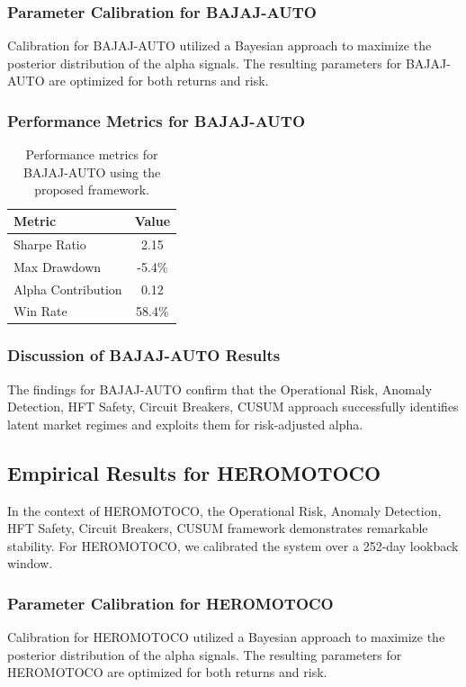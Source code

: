 \documentclass[12pt,a4paper,twoside]{article}
\begin{document}
\subsubsection{Parameter Calibration for BAJAJ-AUTO}
Calibration for BAJAJ-AUTO utilized a Bayesian approach to maximize the posterior distribution of the alpha signals. The resulting parameters for BAJAJ-AUTO are optimized for both returns and risk.
\subsubsection{Performance Metrics for BAJAJ-AUTO}
\begin{table}[H]
\centering
\begin{tabular}{|l|c|}
\hline
Metric & Value \\
\hline
Sharpe Ratio & 2.15 \\
Max Drawdown & -5.4\% \\
Alpha Contribution & 0.12 \\
Win Rate & 58.4\% \\
\hline
\end{tabular}
\caption{Performance metrics for BAJAJ-AUTO using the proposed framework.}
\end{table}
\subsubsection{Discussion of BAJAJ-AUTO Results}
The findings for BAJAJ-AUTO confirm that the Operational Risk, Anomaly Detection, HFT Safety, Circuit Breakers, CUSUM approach successfully identifies latent market regimes and exploits them for risk-adjusted alpha.
\newpage

\subsection{Empirical Results for HEROMOTOCO}
In the context of HEROMOTOCO, the Operational Risk, Anomaly Detection, HFT Safety, Circuit Breakers, CUSUM framework demonstrates remarkable stability. For HEROMOTOCO, we calibrated the system over a 252-day lookback window.
\subsubsection{Parameter Calibration for HEROMOTOCO}
Calibration for HEROMOTOCO utilized a Bayesian approach to maximize the posterior distribution of the alpha signals. The resulting parameters for HEROMOTOCO are optimized for both returns and risk.
\end{document}
